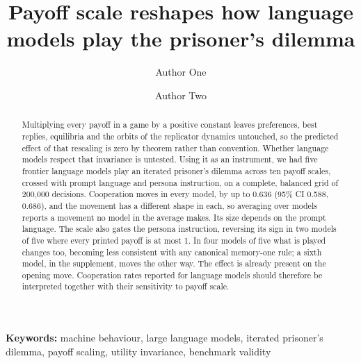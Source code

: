 \documentclass[11pt,a4paper]{article}
\title{\bfseries Payoff scale reshapes how language models play the
prisoner's dilemma}
\author[1,$\ast$]{Author One}
\author[1,2]{Author Two}
\affil[1]{Affiliation One}
\affil[2]{Affiliation Two}
\affil[$\ast$]{Corresponding author: \texttt{name@institution.example}}
\date{}
\begin{document}
\maketitle

%
%

\begin{abstract}
\noindent
Multiplying every payoff in a game by a positive constant leaves preferences,
best replies, equilibria and the orbits of the replicator dynamics untouched,
so the predicted effect of that rescaling is zero
by theorem rather than convention. Whether language models respect that
invariance is untested. Using it as an instrument, we had five frontier language
models play an iterated prisoner's dilemma across ten payoff scales, crossed
with prompt language and persona instruction, on a complete, balanced grid of
200{,}000 decisions. Cooperation moves in every model, by up to 0.636
(95\% CI 0.588, 0.686), and the movement has a different shape in each, so
averaging over models reports a movement no model in the average makes. Its
size depends on the prompt language. The scale also gates the persona
instruction, reversing its sign in two models of five where every printed payoff
is at most 1. In four models of five what is played changes too, becoming less
consistent with any canonical memory-one rule; a sixth model, in the
supplement, moves the other way. The effect is already present on
the opening move. Cooperation rates reported for language models should
therefore be interpreted together with their sensitivity to payoff scale.
\end{abstract}

\noindent\textbf{Keywords:} machine behaviour, large language models, iterated
prisoner's dilemma, payoff scaling, utility invariance, benchmark validity


%
%
\end{document}
